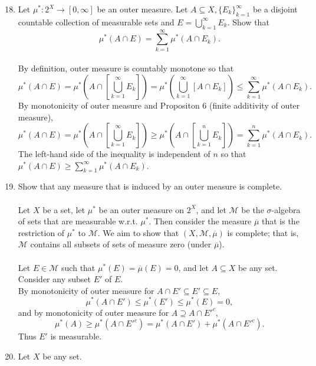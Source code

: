 \begin{enumerate}
	\setcounter{enumi}{17}
	\item Let $\mu^*:2^X\to[0,\infty]$ be an outer measure.
	Let $A\subseteq X, \{E_k\}_{k=1}^\infty$ be a disjoint countable collection of measurable sets and $E=\bigcup_{k=1}^\infty E_k$. Show that
	\[
		\mu^*(A\cap E)=\sum_{k=1}^\infty \mu^*(A\cap E_k).
	\]
	\\By definition, outer measure is countably monotone so that
	\[
		\mu^*(A\cap E)=\mu^*\left(A\cap \left[\bigcup_{k=1}^\infty E_k\right]\right)=\mu^*\left(\bigcup_{k=1}^\infty [A\cap E_k]\right)\le\sum_{k=1}^\infty \mu^*(A\cap E_k).
	\]
	By monotonicity of outer measure and Propositon 6 (finite additivity of outer measure),
	\[
		\mu^*(A\cap E)=\mu^*\left(A\cap \left[\bigcup_{k=1}^\infty E_k\right]\right)\ge\mu^*\left(A\cap \left[\bigcup_{k=1}^n E_k\right]\right)=\sum_{k=1}^n \mu^*(A\cap E_k).
	\]
	The left-hand side of the inequality is independent of $n$ so that $\mu^*(A\cap E)\ge\sum_{k=1}^\infty \mu^*(A\cap E_k)$.
	\item Show that any measure that is induced by an outer measure is complete.\\
	\\Let $X$ be a set, let $\mu^*$ be an outer measure on $2^X$, and let $\mathcal{M}$ be the $\sigma$-algebra of sets that are measurable w.r.t. $\mu^*$.
	Then consider the measure $\overline{\mu}$ that is the restriction of $\mu^*$ to $\mathcal{M}$.
	We aim to show that $(X,\mathcal{M},\overline{\mu})$ is complete; that is, $\mathcal{M}$ contains all subsets of sets of measure zero (under $\overline{\mu}$).\\
	\\Let $E\in\mathcal{M}$ such that $\mu^*(E)=\overline{\mu}(E)=0$, and let $A\subseteq X$ be any set.
	\\Consider any subset $E'$ of $E$.
	\\By monotonicity of outer measure for $A\cap E'\subseteq E'\subseteq E$,
	\[
		\mu^*(A\cap E')\le\mu^*(E')\le\mu^*(E)=0,
	\]
	and by monotonicity of outer measure for $A\supseteq A\cap E'^c$,
	\[
		\mu^*(A)\ge\mu^*(A\cap E'^c)=\mu^*(A\cap E')+\mu^*(A\cap E'^c).
	\]
	Thus $E'$ is measurable.
	\item Let $X$ be any set.

\end{enumerate}

